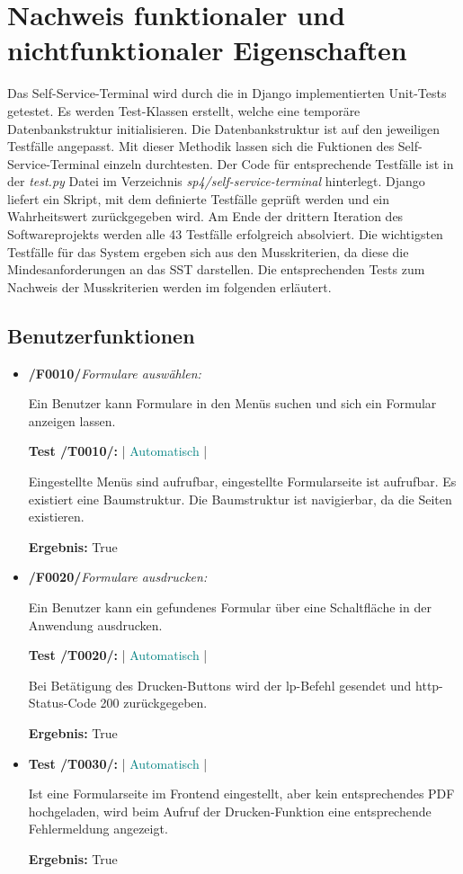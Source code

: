 \section{Nachweis funktionaler und nichtfunktionaler Eigenschaften}

Das Self-Service-Terminal wird durch die in Django implementierten Unit-Tests getestet. Es werden Test-Klassen erstellt, welche eine temporäre Datenbankstruktur initialisieren. Die Datenbankstruktur ist auf den jeweiligen Testfälle angepasst. Mit dieser Methodik lassen sich die Fuktionen des Self-Service-Terminal einzeln durchtesten. Der Code für entsprechende Testfälle ist in der \textit{test.py} Datei im Verzeichnis \textit{sp4/self-service-terminal} hinterlegt. Django liefert ein Skript, mit dem definierte Testfälle geprüft werden und ein Wahrheitswert zurückgegeben wird. Am Ende der drittern Iteration des Softwareprojekts werden alle 43 Testfälle erfolgreich absolviert. Die wichtigsten Testfälle für das System ergeben sich aus den Musskriterien, da diese die Mindesanforderungen an das SST darstellen. Die entsprechenden Tests zum Nachweis der Musskriterien werden im folgenden erläutert.

\vspace{1cm}

\subsection{Benutzerfunktionen}

\begin{itemize}
    \item \textbf{/F0010/}\textit{Formulare auswählen:} \par
    Ein Benutzer kann Formulare in den Menüs suchen und sich ein Formular anzeigen lassen.\par
    \noindent \textbf{Test /T0010/:} | \textcolor{teal}{Automatisch} |\par 
    Eingestellte Menüs sind aufrufbar, eingestellte Formularseite ist aufrufbar. Es existiert eine Baumstruktur. Die Baumstruktur ist navigierbar, da die Seiten existieren.\par
    \noindent \textbf{Ergebnis:} True
    \newpage
    \item \textbf{/F0020/}\textit{Formulare ausdrucken:} \par
    Ein Benutzer kann ein gefundenes Formular über eine Schaltfläche in der Anwendung ausdrucken.\par
    \noindent \textbf{Test /T0020/:} | \textcolor{teal}{Automatisch} |  \par
    Bei Betätigung des Drucken-Buttons wird der lp-Befehl gesendet und http-Status-Code 200 zurückgegeben.\par
    \noindent \textbf{Ergebnis:} True
    \item \noindent \textbf{Test /T0030/:} | \textcolor{teal}{Automatisch} |\par  Ist eine Formularseite im Frontend eingestellt, aber kein entsprechendes PDF hochgeladen, wird beim Aufruf der Drucken-Funktion eine entsprechende Fehlermeldung angezeigt.\par
    \noindent \textbf{Ergebnis:} True
\end{itemize}
\vspace{1cm}
